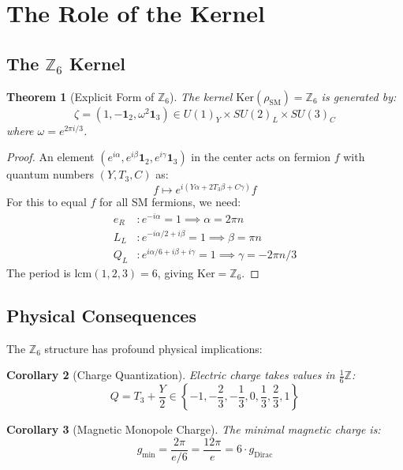 \documentclass[11pt,a4paper,openright]{book}
\theoremstyle{plain}
\newtheorem{theorem}{Theorem}[chapter]
\newtheorem{corollary}[theorem]{Corollary}
\theoremstyle{definition}
\newcommand{\SM}{\mathrm{SM}}
\newcommand{\Ker}{\mathrm{Ker}}
\newcommand{\Z}{\mathbb{Z}}
\begin{document}
\section{The Role of the Kernel}

\subsection{The $\Z_6$ Kernel}

\begin{theorem}[Explicit Form of $\Z_6$]
\label{thm:z6-explicit}
The kernel $\Ker(\rho_{\SM}) = \Z_6$ is generated by:
\begin{equation}
\zeta = (1, -\mathbf{1}_2, \omega^2 \mathbf{1}_3) \in U(1)_Y \times SU(2)_L \times SU(3)_C
\end{equation}
where $\omega = e^{2\pi i/3}$.
\end{theorem}

\begin{proof}
An element $(e^{i\alpha}, e^{i\beta}\mathbf{1}_2, e^{i\gamma}\mathbf{1}_3)$ in the center acts on fermion $f$ with quantum numbers $(Y, T_3, C)$ as:
\[
f \mapsto e^{i(Y\alpha + 2T_3\beta + C\gamma)} f
\]
For this to equal $f$ for all SM fermions, we need:
\begin{align}
e_R &: e^{-i\alpha} = 1 \implies \alpha = 2\pi n \\
L_L &: e^{-i\alpha/2 + i\beta} = 1 \implies \beta = \pi n \\
Q_L &: e^{i\alpha/6 + i\beta + i\gamma} = 1 \implies \gamma = -2\pi n/3
\end{align}
The period is $\mathrm{lcm}(1, 2, 3) = 6$, giving $\Ker = \Z_6$.
\end{proof}

\subsection{Physical Consequences}

The $\Z_6$ structure has profound physical implications:

\begin{corollary}[Charge Quantization]
Electric charge takes values in $\frac{1}{6}\Z$:
\begin{equation}
Q = T_3 + \frac{Y}{2} \in \left\{-1, -\frac{2}{3}, -\frac{1}{3}, 0, \frac{1}{3}, \frac{2}{3}, 1\right\}
\end{equation}
\end{corollary}

\begin{corollary}[Magnetic Monopole Charge]
The minimal magnetic charge is:
\begin{equation}
g_{\min} = \frac{2\pi}{e/6} = \frac{12\pi}{e} = 6 \cdot g_{\mathrm{Dirac}}
\end{equation}
\end{corollary}
\end{document}
